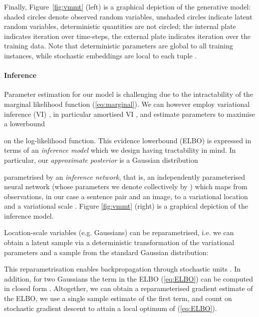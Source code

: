 \documentclass[11pt,a4paper]{article}
\begin{document}
Finally, Figure~\ref{fig:vmmt} (left) is a graphical depiction of the generative model: shaded circles denote observed random variables, unshaded circles indicate latent random variables, deterministic quantities are not circled; the internal plate indicates iteration over time-steps, the external plate indicates iteration over the training data. Note that deterministic parameters  are global to all training instances, while stochastic embeddings  are local to each tuple .





\paragraph{Inference} Parameter estimation for our model is challenging due to the intractability of the marginal likelihood function (\ref{eq:marginal}).
We can however employ variational inference (VI) \cite{Jordan+1999:VI}, in particular amortised VI \citep{Kingma+2014:VAE,Rezende+14:DGM}, and estimate parameters to maximise a lowerbound

 on the log-likelihood function. 
This evidence lowerbound (ELBO) is expressed in terms of an  \emph{inference model}  which we design having tractability in mind. In particular, our \emph{approximate posterior} is a Gaussian distribution 

parametrised by an \emph{inference network}, that is, an independently parameterised neural network (whose parameters we denote collectively by ) which maps from observations, in our case a sentence pair and an image, to a variational location  and a variational scale . 
Figure \ref{fig:vmmt} (right) is a graphical depiction of the inference model.


Location-scale variables (e.g. Gaussians) can be reparametrised, i.e. we can obtain a latent sample via a deterministic transformation of the variational parameters and a sample from the standard Gaussian  distribution:

This reparametrisation enables backpropagation through stochastic units \citep{Kingma+2014:VAE,TitsiasEtAl2014doubly}.
In addition, for two Gaussians the  term in the ELBO (\ref{eq:ELBO}) can be computed in closed form \citep[Appendix B]{Kingma+2014:VAE}.
 Altogether, we can obtain a reparameterised gradient estimate of the ELBO, we use a single sample estimate of the first term,  and count on stochastic gradient descent to attain a local optimum of (\ref{eq:ELBO}).
\end{document}
